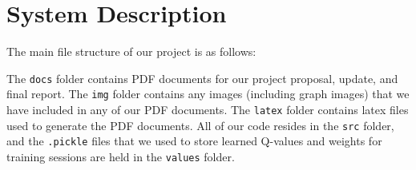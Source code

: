 \documentclass[11pt]{article}
\begin{document}
\appendix

\section{System Description}
The main file structure of our project is as follows:

\bigskip


\bigskip

The \texttt{docs} folder contains PDF documents for our project proposal, update, and final report. The \texttt{img} folder contains any images (including graph images) that we have included in any of our PDF documents. The \texttt{latex} folder contains latex files used to generate the PDF documents. All of our code resides in the \texttt{src} folder, and the \texttt{.pickle} files that we used to store learned Q-values and weights for training sessions are held in the \texttt{values} folder.

\bigskip
\end{document}
